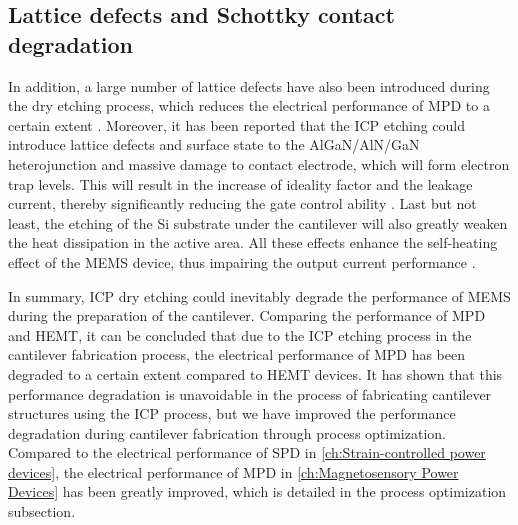 \subsection{Lattice defects and Schottky contact degradation}

In  addition, a large number of lattice defects  have also been introduced during the  dry etching process, which reduces the electrical performance of MPD  to a certain extent \cite{ladroue2010deep,pearton2000review,huang2004inductively}. Moreover, it has been reported that the  ICP etching could introduce lattice defects and surface state to the AlGaN/AlN/GaN heterojunction  and massive damage to contact  electrode, which will form electron trap levels. This will result in the increase of ideality factor and the leakage current, thereby significantly reducing the gate control ability \cite{cao2000schottky,choi2003observation,fang2003etching,JieLiu2007Influence}. Last but not least, the etching of the Si substrate under the cantilever will also greatly weaken the heat dissipation in the active area. All these effects enhance the self-heating effect  of the  MEMS device, thus impairing the  output current performance \cite{yang2011high,hajjiah2020effect,greco2017temperature}.

In summary, ICP  dry etching could inevitably degrade  the performance of  MEMS during the preparation of the  cantilever. Comparing the performance of  MPD and  HEMT, it can be concluded that due to the ICP etching process in the cantilever fabrication process, the electrical performance of MPD has been degraded to a certain extent compared to HEMT devices. It has shown that this performance degradation  is unavoidable in the process of fabricating cantilever  structures using the ICP process, but we have improved the performance degradation during cantilever  fabrication through process optimization. Compared to the electrical performance of SPD  in \autoref{ch:Strain-controlled power devices}, the electrical performance of  MPD in \autoref{ch:Magnetosensory Power Devices} has been greatly improved, which is detailed in the process optimization  subsection.

